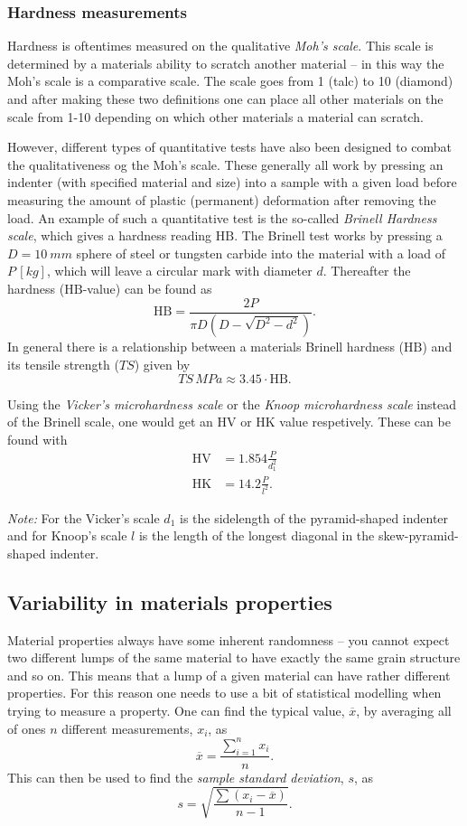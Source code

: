 \subsubsection{Hardness measurements}
Hardness is oftentimes measured on the qualitative \textit{Moh's scale}. This scale is determined by a materials ability to scratch another material -- in this way the Moh's scale is a comparative scale. The scale goes from 1 (talc) to 10 (diamond) and after making these two definitions one can place all other materials on the scale from 1-10 depending on which other materials a material can scratch.

However, different types of quantitative tests have also been designed to combat the qualitativeness og the Moh's scale. These generally all work by pressing an indenter (with specified material and size) into a sample with a given load before measuring the amount of plastic (permanent) deformation after removing the load. An example of such a quantitative test is the so-called \textit{Brinell Hardness scale}, which gives a hardness reading $\mathrm{HB}$. The Brinell test works by pressing a $D = \qty{10}{mm}$ sphere of steel or tungsten carbide into the material with a load of $P \, [\unit{kg}]$, which will leave a circular mark with diameter $d$. Thereafter the hardness ($\mathrm{HB}$-value) can be found as
\[ 
\mathrm{HB} = \frac{2P}{\pi D \left( D - \sqrt{D^2 - d^2} \right)}
.\]
In general there is a relationship between a materials Brinell hardness ($\mathrm{HB}$) and its tensile strength ($TS$) given by
\[ 
  TS \, \unit{MPa} \approx \num{3,45} \cdot \mathrm{HB}
.\]

Using the \textit{Vicker's microhardness scale} or the \textit{Knoop microhardness scale} instead of the Brinell scale, one would get an $\mathrm{HV}$ or $\mathrm{HK}$ value respetively. These can be found with
\begin{align*}
  \mathrm{HV} &= \num{1.854} \frac{P}{d_1^2} \\
  \mathrm{HK} &= \num{14,2} \frac{P}{l^2}
.\end{align*}

\textit{Note:} For the Vicker's scale $d_1$ is the sidelength of the pyramid-shaped indenter and for Knoop's scale $l$ is the length of the longest diagonal in the skew-pyramid-shaped indenter.


\subsection{Variability in materials properties}
Material properties always have some inherent randomness -- you cannot expect two different lumps of the same material to have exactly the same grain structure and so on. This means that a lump of a given material can have rather different properties. For this reason one needs to use a bit of statistical modelling when trying to measure a property. One can find the typical value, $\overline{x}$, by averaging all of ones $n$ different measurements, $x_i$, as
\[ 
  \overline{x} = \frac{\sum_{i = 1}^{n} x_i}{n}
.\]
This can then be used to find the \textit{sample standard deviation}, $s$, as
\[ 
s = \sqrt{\frac{\sum (x_i - \overline{x})}{n-1}}
.\]

